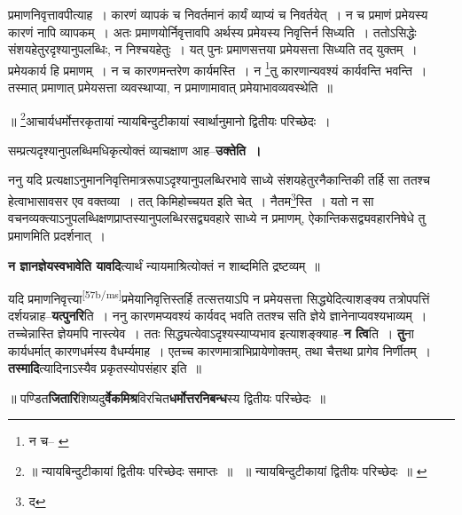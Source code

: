 \documentclass[article,12pt,a4paper]{memoir}
\begin{document}
	  \pstart प्रमाणनिवृत्तावपीत्याह । कारणं व्यापकं च निवर्तमानं कार्यं व्याप्यं च निवर्तयेत् । न च प्रमाणं प्रमेयस्य कारणं नापि व्यापकम् । अतः प्रमाणयोर्निवृत्तावपि अर्थस्य प्रमेयस्य निवृत्तिर्न सिध्यति । ततोऽसिद्धेः संशयहेतुरदृश्यानुपलब्धिः, न निश्चयहेतुः । यत् पुनः प्रमाणसत्तया प्रमेयसत्ता सिध्यति तद् युक्तम् । प्रमेयकार्य हि प्रमाणम् । न च कारणमन्तरेण कार्यमस्ति । न \footnote{न च--\cite{dp-msB} \cite{dp-msD}}तु कारणान्यवश्यं कार्यवन्ति भवन्ति । तस्मात् प्रमाणात् प्रमेयसत्ता व्यवस्थाप्या, न प्रमाणामावात् प्रमेयाभावव्यवस्थेति ॥
	\pend
       

	  \pstart ॥ \footnote{॥ न्यायबिन्दुटीकायां द्वितीयः परिच्छेदः समाप्तः ॥ \cite{dp-msA} \cite{dp-msB} \cite{dp-edP} \cite{dp-edH} \cite{dp-edE} ॥ न्यायबिन्दुटीकायां द्वितीयः परिच्छेदः ॥ \cite{dp-msD}}आचार्यधर्मोत्तरकृतायां न्यायबिन्दुटीकायां स्वार्थानुमानो द्वितीयः परिच्छेदः ।
	\pend
      

	  \pstart सम्प्रत्यदृश्यानुपलब्धिमधिकृत्योक्तं व्याचक्षाण आह--\textbf{उक्तेति ।}
	\pend
      

	  \pstart ननु यदि प्रत्यक्षाऽनुमाननिवृत्तिमात्ररूपाऽदृश्यानुपलब्धिरभावे साध्ये संशयहेतुरनैकान्तिकी तर्हि सा ततश्च हेत्वाभासावसर एव वक्तव्या । तत् किमिहोच्चयत इति चेत् । नैतम\footnote{द}स्ति । यतो न सा वचनव्यक्त्याऽनुपलब्धिक्षणप्राप्तस्यानुपलब्धिरसद्व्यवहारे साध्ये न प्रमाणम्, ऐकान्तिकसद्व्यवहारनिषेधे तु प्रमाणमिति प्रदर्शनात् ।
	\pend
      

	  \pstart \textbf{न ज्ञानज्ञेयस्वभावेति यावदि}त्यार्थं न्यायमाश्रित्योक्तं न शाब्दमिति द्रष्टव्यम् ॥
	\pend
      

	  \pstart यदि प्रमाणनिवृत्त्या\leavevmode\textsuperscript{\rmlatinfont\tiny [57b/ms]}प्रमेयानिवृत्तिस्तर्हि तत्सत्तयाऽपि न प्रमेयसत्ता सिद्ध्येदित्याशङ्क्य तत्रोपपत्तिं दर्शयन्नाह--\textbf{यत्पुनरि}ति । ननु कारणमप्यवश्यं कार्यवद् भवति ततश्च सति ज्ञेये ज्ञानेनाप्यवश्यभाव्यम् । तच्चेन्नास्ति ज्ञेयमपि नास्त्येव । ततः सिद्ध्यत्येवाऽदृश्यस्याप्यभाव इत्याशङ्क्याह--\textbf{न त्वि}ति । \textbf{तु}ना कार्यधर्मात् कारणधर्मस्य वैधर्म्यमाह । एतच्च कारणमात्राभिप्रायेणोक्तम्, तथा चैत्तथा प्रागेव निर्णीतम् । \textbf{तस्मादि}त्यादिनाऽस्यैव प्रकृतस्योपसंहार इति ॥
	\pend
      

	  \pstart ॥ पण्डित\textbf{जितारि}शिष्यदु\textbf{र्वेकमिश्र}विरचित\textbf{धर्मोत्तरनिबन्ध}स्य द्वितीयः परिच्छेदः ॥
	\pend
      
	    
	    \endnumbering%
	    \endgroup
	    
	  
	  
	
\end{document}
